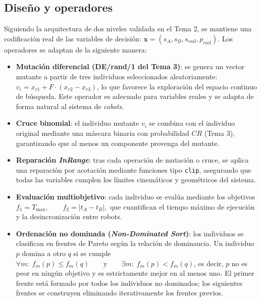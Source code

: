\subsection*{Diseño y operadores}
Siguiendo la arquitectura de dos niveles validada en el Tema 2, se mantiene una
codificación real de las variables de decisión: $\mathbf{x} = (s_A, s_B, s_{rail}, p_{rail})$. 
Los operadores se adaptan de la siguiente manera:
\begin{itemize}

    \item \textbf{Mutación diferencial (DE/rand/1 del Tema 3)}: se genera un vector mutante a partir de tres
    individuos seleccionados aleatoriamente: $v_i = x_{r1} + F \cdot (x_{r2} - x_{r3})$,
    lo que favorece la exploración del espacio continuo de búsqueda.
    Este operador es adecuado para variables reales y se adapta de forma natural al sistema de
    \textit{cobots}.  

    \item \textbf{Cruce binomial}: el individuo mutante $v_i$ se combina con el individuo original
    mediante una máscara binaria con probabilidad $CR$ (Tema 3), garantizando que al menos un componente
    provenga del mutante. 

    \item \textbf{Reparación \textit{InRange}}: tras cada operación de mutación o cruce, se aplica una
    reparación por acotación mediante funciones tipo \texttt{clip}, asegurando que todas las
    variables cumplen los límites cinemáticos y geométricos del sistema.  

    \item \textbf{Evaluación multiobjetivo}: cada individuo se evalúa mediante los objetivos
    $f_1 = T_{\max}, \qquad f_2 = |t_A - t_B|,$ que cuantifican el tiempo máximo de ejecución y la
    desincronización entre robots.  

\item \textbf{Ordenación no dominada (\textit{Non-Dominated Sort})}: los individuos se
clasifican en frentes de Pareto según la relación de dominancia. Un individuo $p$ domina a otro
$q$ si se cumple $\forall m:\; f_m(p) \le f_m(q) \qquad\text{y}\qquad \exists m:\; f_m(p) < f_m(q)$,
es decir, $p$ no es peor en ningún objetivo y es estrictamente mejor en al menos uno. El primer
frente está formado por todos los individuos no dominados; los siguientes frentes se construyen
eliminando iterativamente los frentes previos.


\end{itemize}
